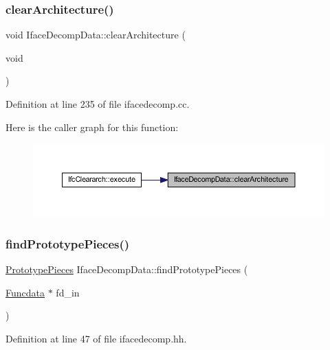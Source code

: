 \subsubsection{\texorpdfstring{clearArchitecture()}{clearArchitecture()}}
{\footnotesize\ttfamily void Iface\+Decomp\+Data\+::clear\+Architecture (\begin{DoxyParamCaption}\item[{void}]{ }\end{DoxyParamCaption})}



Definition at line 235 of file ifacedecomp.\+cc.

Here is the caller graph for this function\+:
\nopagebreak
\begin{figure}[H]
\begin{center}
\leavevmode
\includegraphics[width=350pt]{class_iface_decomp_data_a23c95a500eccef410cbe4049b2d3cce3_icgraph}
\end{center}
\end{figure}
\mbox{\label{class_iface_decomp_data_af70c37173793122de0725e227c5f84a8}} 
\subsubsection{\texorpdfstring{findPrototypePieces()}{findPrototypePieces()}}
{\footnotesize\ttfamily \mbox{\hyperlink{struct_prototype_pieces}{Prototype\+Pieces}} Iface\+Decomp\+Data\+::find\+Prototype\+Pieces (\begin{DoxyParamCaption}\item[{\mbox{\hyperlink{class_funcdata}{Funcdata}} $\ast$}]{fd\+\_\+in }\end{DoxyParamCaption})\hspace{0.3cm}{\ttfamily [inline]}}



Definition at line 47 of file ifacedecomp.\+hh.

\mbox{\label{class_iface_decomp_data_abe1506740923a97939ace2445d351b45}} 
